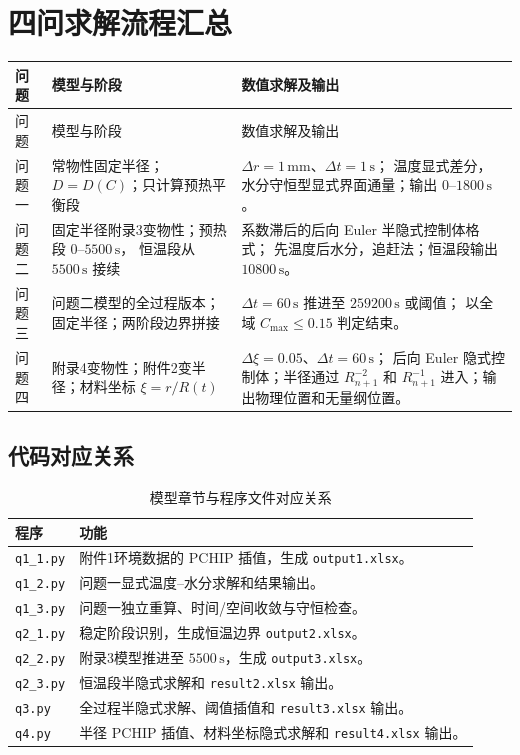 \documentclass[UTF8,a4paper,11pt]{ctexart}
\numberwithin{equation}{section}
\begin{document}
\section{四问求解流程汇总}

\begin{longtable}{>{\raggedright\arraybackslash}p{}
                  >{\raggedright\arraybackslash}p{}
                  >{\raggedright\arraybackslash}p{}}
\toprule
问题 & 模型与阶段 & 数值求解及输出 \\
\midrule
\endfirsthead
\toprule
问题 & 模型与阶段 & 数值求解及输出 \\
\midrule
\endhead
问题一 &
常物性固定半径；\(D=D(C)\)；只计算预热平衡段 &
\(\Delta r=1\,\mathrm{mm}\)、\(\Delta t=1\,\mathrm{s}\)；
温度显式差分，水分守恒型显式界面通量；输出 \(0\)--\(1800\,\mathrm{s}\)。\\
\midrule
问题二 &
固定半径附录3变物性；预热段 \(0\)--\(5500\,\mathrm{s}\)，
恒温段从 \(5500\,\mathrm{s}\) 接续 &
系数滞后的后向 Euler 半隐式控制体格式；
先温度后水分，追赶法；恒温段输出 \(10800\,\mathrm{s}\)。\\
\midrule
问题三 &
问题二模型的全过程版本；固定半径；两阶段边界拼接 &
\(\Delta t=60\,\mathrm{s}\) 推进至 \(259200\,\mathrm{s}\) 或阈值；
以全域 \(C_{\max}\le0.15\) 判定结束。\\
\midrule
问题四 &
附录4变物性；附件2变半径；材料坐标 \(\xi=r/R(t)\) &
\(\Delta\xi=0.05\)、\(\Delta t=60\,\mathrm{s}\)；
后向 Euler 隐式控制体；半径通过 \(R_{n+1}^{-2}\) 和
\(R_{n+1}^{-1}\) 进入；输出物理位置和无量纲位置。\\
\bottomrule
\end{longtable}

\subsection{代码对应关系}

\begin{table}[H]
\centering
\caption{模型章节与程序文件对应关系}
\begin{tabular}{>{\raggedright\arraybackslash}p{}
                >{\raggedright\arraybackslash}p{}}
\toprule
程序 & 功能 \\
\midrule
\texttt{q1\_1.py} & 附件1环境数据的 PCHIP 插值，生成 \texttt{output1.xlsx}。\\
\texttt{q1\_2.py} & 问题一显式温度--水分求解和结果输出。\\
\texttt{q1\_3.py} & 问题一独立重算、时间/空间收敛与守恒检查。\\
\texttt{q2\_1.py} & 稳定阶段识别，生成恒温边界 \texttt{output2.xlsx}。\\
\texttt{q2\_2.py} & 附录3模型推进至 \(5500\,\mathrm{s}\)，生成 \texttt{output3.xlsx}。\\
\texttt{q2\_3.py} & 恒温段半隐式求解和 \texttt{result2.xlsx} 输出。\\
\texttt{q3.py} & 全过程半隐式求解、阈值插值和 \texttt{result3.xlsx} 输出。\\
\texttt{q4.py} & 半径 PCHIP 插值、材料坐标隐式求解和 \texttt{result4.xlsx} 输出。\\
\bottomrule
\end{tabular}
\end{table}
\end{document}
